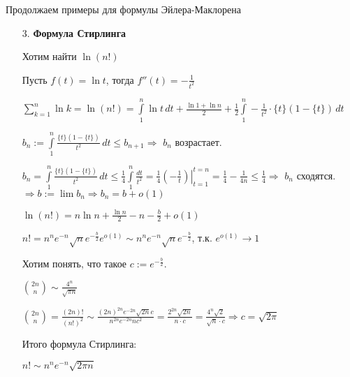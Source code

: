 Продолжаем примеры для формулы Эйлера-Маклорена
\begin{example} \thmslashn
\begin{enumerate}
    \item[3.] \textbf{Формула Стирлинга}
    
    Хотим найти $\ln (n!)$
    
    Пусть $f(t) = \ln t$, тогда $f''(t) = -\frac{1}{t^2}$
    
    $\sum\limits_{k=1}^{n} \ln k = \ln (n!) = \int\limits_{1}^{n} \ln t \,dt + \frac{\ln 1 + \ln n}{2} + \frac{1}{2} \int\limits_{1}^{n} -\frac{1}{t^2} \cdot \{t\}(1 - \{t\})\,dt$
    
    $b_n := \int\limits_{1}^{n} \frac{\{t\}(1 - \{t\})}{t^2}\,dt \leqslant b_{n+1} \Rightarrow$ $b_n$ возрастает.
    
    $b_n = \int\limits_{1}^{n} \frac{\{t\}(1 - \{t\})}{t^2}\,dt \leqslant \frac{1}{4}\int\limits_{1}^{n} \frac{dt}{t^2} = \left.\frac{1}{4} \left( -\frac{1}{t} \right) \right|_{t=1}^{t=n} = \frac{1}{4} - \frac{1}{4n} \leqslant \frac{1}{4} \Rightarrow$ $b_n$ сходятся. $\Rightarrow b:= \lim b_n \Rightarrow b_n = b + o(1)$
    
    $\ln(n!) = n\ln n + \frac{\ln n}{2} -n -\frac{b}{2} + o(1)$
    
    $n! = n^n e^{-n} \sqrt{n} e^{-\frac{b}{2}} e^{o(1)} \sim n^ne^{-n}\sqrt{n}e^{-\frac{b}{2}}$, т.к. $e^{o(1)} \to 1$
    
    Хотим понять, что такое $c := e^{-\frac{b}{2}}$.
    
    $\binom{2n}{n} \sim \frac{4^n}{\sqrt{\pi n}}$
    
    $\binom{2n}{n} = \frac{(2n)!}{(n!)^2} \sim \frac{(2n)^{2n} e^{-2n}\sqrt{2n} c}{n^{2n} e^{-2n} n c^2} = \frac{2^{2n} \sqrt{2n}}{n\cdot c} = \frac{4^n \sqrt{2}}{\sqrt{n} \cdot c} \Rightarrow c = \sqrt{2 \pi}$
    
    
    Итого формула Стирлинга:
    
    $n! \sim n^ne^{-n}\sqrt{2 \pi n}$
    
\end{enumerate}
\end{example}